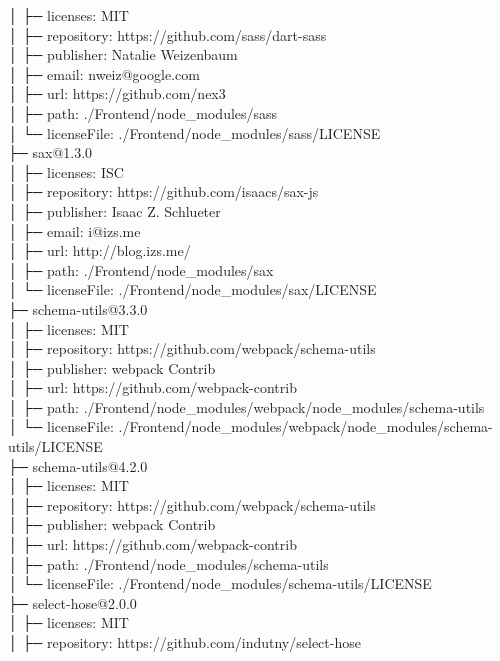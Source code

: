 │  ├─ licenses: MIT\\
│  ├─ repository: https://github.com/sass/dart-sass\\
│  ├─ publisher: Natalie Weizenbaum\\
│  ├─ email: nweiz@google.com\\
│  ├─ url: https://github.com/nex3\\
│  ├─ path: ./Frontend/node\_modules/sass\\
│  └─ licenseFile: ./Frontend/node\_modules/sass/LICENSE\\
├─ sax@1.3.0\\
│  ├─ licenses: ISC\\
│  ├─ repository: https://github.com/isaacs/sax-js\\
│  ├─ publisher: Isaac Z. Schlueter\\
│  ├─ email: i@izs.me\\
│  ├─ url: http://blog.izs.me/\\
│  ├─ path: ./Frontend/node\_modules/sax\\
│  └─ licenseFile: ./Frontend/node\_modules/sax/LICENSE\\
├─ schema-utils@3.3.0\\
│  ├─ licenses: MIT\\
│  ├─ repository: https://github.com/webpack/schema-utils\\
│  ├─ publisher: webpack Contrib\\
│  ├─ url: https://github.com/webpack-contrib\\
│  ├─ path: ./Frontend/node\_modules/webpack/node\_modules/schema-utils\\
│  └─ licenseFile: ./Frontend/node\_modules/webpack/node\_modules/schema-utils/LICENSE\\
├─ schema-utils@4.2.0\\
│  ├─ licenses: MIT\\
│  ├─ repository: https://github.com/webpack/schema-utils\\
│  ├─ publisher: webpack Contrib\\
│  ├─ url: https://github.com/webpack-contrib\\
│  ├─ path: ./Frontend/node\_modules/schema-utils\\
│  └─ licenseFile: ./Frontend/node\_modules/schema-utils/LICENSE\\
├─ select-hose@2.0.0\\
│  ├─ licenses: MIT\\
│  ├─ repository: https://github.com/indutny/select-hose\\
